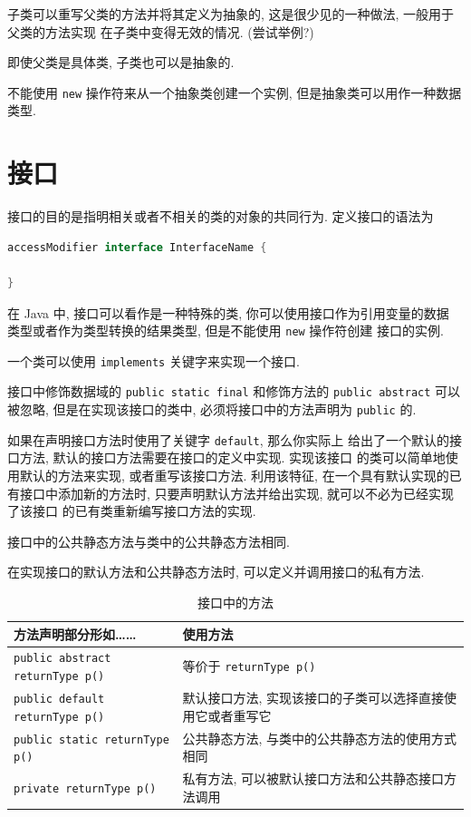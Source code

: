 \documentclass[10pt,UTF8]{book} %
\begin{document}
子类可以重写父类的方法并将其定义为抽象的, 这是很少见的一种做法, 一般用于父类的方法实现
在子类中变得无效的情况. (尝试举例?)

即使父类是具体类, 子类也可以是抽象的.

不能使用 \lstinline|new| 操作符来从一个抽象类创建一个实例, 但是抽象类可以用作一种数据类型.

\section{接口}

接口的目的是指明相关或者不相关的类的对象的共同行为. 定义接口的语法为
\begin{lstlisting}[language=Java]
accessModifier interface InterfaceName {
    
}
\end{lstlisting}

在 Java 中, 接口可以看作是一种特殊的类, 你可以使用接口作为引用变量的数据
类型或者作为类型转换的结果类型, 但是不能使用 \lstinline|new| 操作符创建
接口的实例.

一个类可以使用 \lstinline|implements| 关键字来实现一个接口.

接口中修饰数据域的 \lstinline|public static final| 和修饰方法的
\lstinline|public abstract| 可以被忽略, 但是在实现该接口的类中,
必须将接口中的方法声明为 \lstinline|public| 的.

如果在声明接口方法时使用了关键字 \lstinline|default|, 那么你实际上
给出了一个默认的接口方法, 默认的接口方法需要在接口的定义中实现. 实现该接口
的类可以简单地使用默认的方法来实现, 或者重写该接口方法. 利用该特征,
在一个具有默认实现的已有接口中添加新的方法时, 只要声明默认方法并给出实现,
就可以不必为已经实现了该接口
的已有类重新编写接口方法的实现.

接口中的公共静态方法与类中的公共静态方法相同.

在实现接口的默认方法和公共静态方法时, 可以定义并调用接口的私有方法.

\begin{table}[H]
    \centering
    \caption{接口中的方法}
    \begin{tabular}{p{}p{}}
        \hline 
        \textbf{方法声明部分形如……} & \textbf{使用方法} \\ 
        \hline 
        \lstinline|public abstract returnType p()| & 等价于 \lstinline|returnType p()| \\
        \lstinline|public default returnType p()| & 默认接口方法, 实现该接口的子类可以选择直接使用它或者重写它 \\ 
        \lstinline|public static returnType p()| & 公共静态方法, 与类中的公共静态方法的使用方式相同 \\ 
        \lstinline|private returnType p()| & 私有方法, 可以被默认接口方法和公共静态接口方法调用 \\ 
        \hline
    \end{tabular}
\end{table}
\end{document}
